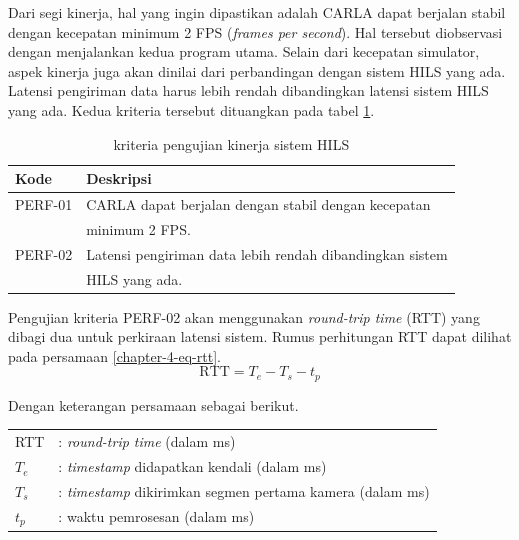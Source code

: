Dari segi kinerja, hal yang ingin dipastikan adalah CARLA dapat berjalan stabil
dengan kecepatan minimum 2 FPS (\textit{frames per second}). Hal tersebut
diobservasi dengan menjalankan kedua program utama. Selain dari kecepatan
simulator, aspek kinerja juga akan dinilai dari perbandingan dengan sistem HILS
yang ada. Latensi pengiriman data harus lebih rendah dibandingkan latensi sistem
HILS yang ada. Kedua kriteria tersebut dituangkan pada tabel
\ref{chapter-4-tbl-perf-criteria}.
\begin{table}[!htbp]
	\begin{center}
		\begin{tabular}{|l|l|}
			\hline
			\textbf{Kode} & \textbf{Deskripsi}                                       \\
			\hline
			PERF-01       & CARLA dapat berjalan dengan stabil dengan kecepatan      \\
			              & minimum 2 FPS.                                           \\
			\hline
			PERF-02       & Latensi pengiriman data lebih rendah dibandingkan sistem \\
			              & HILS yang ada.                                           \\
			\hline
		\end{tabular}
	\end{center}
	\caption{kriteria pengujian kinerja sistem HILS}
	\label{chapter-4-tbl-perf-criteria}
\end{table}

Pengujian kriteria PERF-02 akan menggunakan \textit{round-trip time} (RTT) yang
dibagi dua untuk perkiraan latensi sistem. Rumus perhitungan RTT dapat dilihat
pada persamaan \ref{chapter-4-eq-rtt}.
\begin{equation}
	\label{chapter-4-eq-rtt}
	\text{RTT} = T_{e} - T_{s} - t_p
\end{equation}

Dengan keterangan persamaan sebagai berikut.
\begin{table}[!h]
	\begin{tabular}{l l}
		RTT     & :     \textit{round-trip time} (dalam ms)             \\
		$T_{e}$ & : \textit{timestamp} didapatkan kendali (dalam ms)    \\
		$T_{s}$ & : \textit{timestamp} dikirimkan segmen pertama kamera
		(dalam ms)                                                      \\
		$t_p$   & :   waktu pemrosesan (dalam ms)
	\end{tabular}
\end{table}

